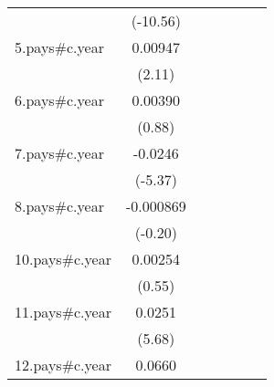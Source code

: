 {\begin{tabular}{l*{6}{c}}
                    &    (-10.56)         &                     &                     &                     &                     &                     \\
[1em]
5.pays#c.year       &     0.00947\sym{*}  &                     &                     &                     &                     &                     \\
                    &      (2.11)         &                     &                     &                     &                     &                     \\
[1em]
6.pays#c.year       &     0.00390         &                     &                     &                     &                     &                     \\
                    &      (0.88)         &                     &                     &                     &                     &                     \\
[1em]
7.pays#c.year       &     -0.0246\sym{***}&                     &                     &                     &                     &                     \\
                    &     (-5.37)         &                     &                     &                     &                     &                     \\
[1em]
8.pays#c.year       &   -0.000869         &                     &                     &                     &                     &                     \\
                    &     (-0.20)         &                     &                     &                     &                     &                     \\
[1em]
10.pays#c.year      &     0.00254         &                     &                     &                     &                     &                     \\
                    &      (0.55)         &                     &                     &                     &                     &                     \\
[1em]
11.pays#c.year      &      0.0251\sym{***}&                     &                     &                     &                     &                     \\
                    &      (5.68)         &                     &                     &                     &                     &                     \\
[1em]
12.pays#c.year      &      0.0660\sym{***}&                     &                     &                     &                     &                     \\

\end{tabular}}
